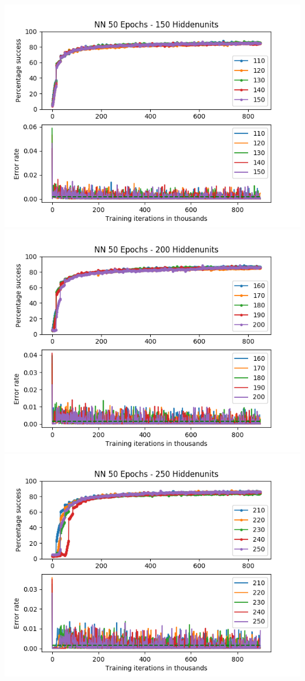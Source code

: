 \documentclass[11pt]{article}
\makeatletter
\def\maxwidth{\ifdim\Gin@nat@width>\linewidth\linewidth
    \else\Gin@nat@width\fi}
\let\Oldincludegraphics\includegraphics
\renewcommand{\includegraphics}[1]{\Oldincludegraphics[width=.8\maxwidth]{#1}}
\makeatother
\begin{document}
\includegraphics{50Epochs_Momentum_03_Experiment3/NN_50Epochs_150Hiddenunits.png}
\includegraphics{50Epochs_Momentum_03_Experiment3/NN_50Epochs_200Hiddenunits.png}
\includegraphics{50Epochs_Momentum_03_Experiment3/NN_50Epochs_250Hiddenunits.png}
\end{document}
